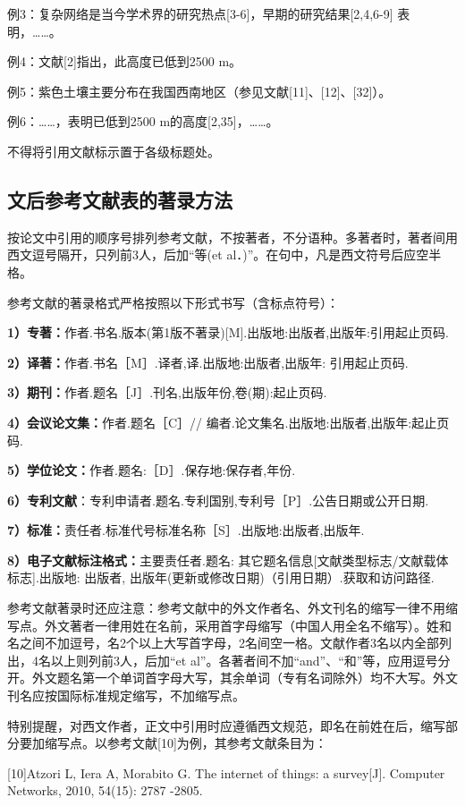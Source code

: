 例3：复杂网络是当今学术界的研究热点[3-6]，早期的研究结果[2,4,6-9] 表明，……。

例4：文献[2]指出，此高度已低到2500 m。

例5：紫色土壤主要分布在我国西南地区（参见文献[11]、[12]、[32]）。

例6：……，表明已低到2500 m的高度[2,35]，……。

不得将引用文献标示置于各级标题处。


\subsection{文后参考文献表的著录方法}


按论文中引用的顺序号排列参考文献，不按著者，不分语种。多著者时，著者间用西文逗号隔开，只列前3人，后加“等(et al．)”。在句中，凡是西文符号后应空半格。

参考文献的著录格式严格按照以下形式书写（含标点符号）：

\textbf{1）专著：}作者.书名.版本(第1版不著录)[M].出版地:出版者,出版年:引用起止页码.

\textbf{2）译著：}作者.书名［M］.译者,译.出版地:出版者,出版年: 引用起止页码.

\textbf{3）期刊：}作者.题名［J］.刊名,出版年份,卷(期):起止页码.

\textbf{4）会议论文集：}作者.题名［C］// 编者.论文集名.出版地:出版者,出版年:起止页码.

\textbf{5）学位论文：}作者.题名:［D］.保存地:保存者,年份.

\textbf{6）专利文献}：专利申请者.题名.专利国别,专利号［P］.公告日期或公开日期.

\textbf{7）标准：}责任者.标准代号标准名称［S］.出版地:出版者,出版年.

\textbf{8）电子文献标注格式：}主要责任者.题名: 其它题名信息[文献类型标志/文献载体标志].出版地: 出版者, 出版年(更新或修改日期)（引用日期）.获取和访问路径.

参考文献著录时还应注意：参考文献中的外文作者名、外文刊名的缩写一律不用缩写点。外文著者一律用姓在名前，采用首字母缩写（中国人用全名不缩写）。姓和名之间不加逗号，名2个以上大写首字母，2名间空一格。文献作者3名以内全部列出，4名以上则列前3人，后加“et al”。各著者间不加“and”、“和”等，应用逗号分开。外文题名第一个单词首字母大写，其余单词（专有名词除外）均不大写。外文刊名应按国际标准规定缩写，不加缩写点。

特别提醒，对西文作者，正文中引用时应遵循西文规范，即名在前姓在后，缩写部分要加缩写点。以参考文献[10]为例，其参考文献条目为：

[10]\quad Atzori L, Iera A, Morabito G. The internet of things: a survey[J]. Computer Networks, 2010, 54(15): 2787 -2805.

